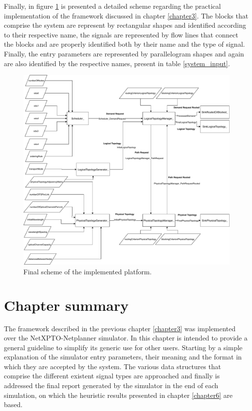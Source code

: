 Finally, in figure \ref{finalPlatformScheme} is presented a detailed scheme regarding the practical implementation of the framework discussed in chapter \ref{chapter3}. The blocks that comprise the system are represent by rectangular shapes and identified according to their respective name, the signals are represented by flow lines that connect the blocks and are properly identified both by their name and the type of signal. Finally, the entry parameters are represented by parallelogram shapes and again are also identified by the respective names, present in table \ref{system_input}.

\begin{figure}[H]
  \begin{center}
    \includegraphics[width=1 \textwidth]{fig/logos/fluxogramaFinalFinal.pdf}
    \caption{Final scheme of the implemented platform.}
    \label{finalPlatformScheme}
  \end{center}
\end{figure}

\section{Chapter summary}

The framework described in the previous chapter \ref{chapter3} was implemented over the NetXPTO-Netplanner simulator. In this chapter is intended to provide a general guideline to simplify its generic use for other users. Starting by a simple explanation of the simulator entry parameters, their meaning and the format in which they are accepted by the system. The various data structures that comprise the different existent signal types are approached and finally is addressed the final report generated by the simulator in the end of each simulation, on which the heuristic results presented in chapter \ref{chapter6} are based.

\cleardoublepage